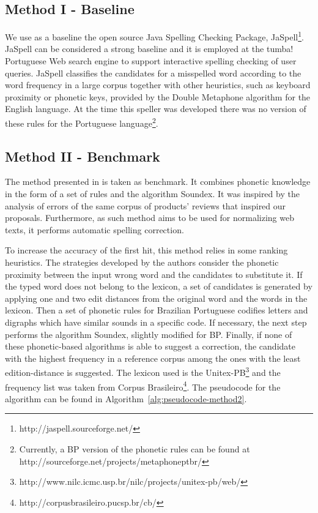 \subsection{Method I - Baseline}

We use as a baseline the open source Java Spelling Checking Package, JaSpell\footnote {http://jaspell.sourceforge.net/}. JaSpell can be  considered a strong baseline and it is  employed at the tumba! Portuguese Web search engine to support interactive spelling checking of user queries. 
JaSpell classifies the candidates for a misspelled word according to the word frequency in a large corpus together with other heuristics, such as keyboard proximity or phonetic keys, provided by the Double Metaphone algorithm \cite{2000double} for the English language. At the time this speller was developed there was no version of these rules for the Portuguese language\footnote{Currently, a BP version of the phonetic rules can be found at http://sourceforge.net/projects/metaphoneptbr/}. 

\subsection{Method II - Benchmark}

The method presented in \cite{Avanco2014} is taken as benchmark. It combines phonetic knowledge in the form of a set of rules and the algorithm Soundex. It was inspired by the analysis of errors of the same corpus of products' reviews \cite{Hartmann2014} that inspired our proposals. Furthermore, as such method aims to be used for normalizing web texts, it performs automatic spelling correction. 

To increase the accuracy of the first hit, this method relies in some ranking heuristics. The strategies developed by the authors consider the phonetic proximity between the input wrong word and the candidates to substitute it. If the typed word does not belong to the lexicon, a set of candidates is generated by applying one and two edit distances from the original word and the words in the lexicon. Then a set of phonetic rules for Brazilian Portuguese codifies letters and digraphs which have similar sounds in a specific code. If necessary, the next step performs the algorithm Soundex, slightly modified for BP. Finally, if none of these phonetic-based algorithms is able to suggest a correction, the candidate with the highest frequency in a reference corpus among the ones with the least edition-distance is suggested. The lexicon used is the Unitex-PB\footnote{http://www.nilc.icmc.usp.br/nilc/projects/unitex-pb/web/} and the frequency list was taken from Corpus Brasileiro\footnote{http://corpusbrasileiro.pucsp.br/cb/}. The pseudocode for the algorithm can be found in Algorithm~\ref{alg:pseudocode-method2}.

